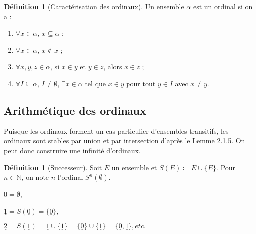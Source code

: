 \documentclass{article}
\theoremstyle{definition}
\newtheorem{definition}[subsubsection]{Définition}
\theoremstyle{plain}
\theoremstyle{plain}
\theoremstyle{plain}
\theoremstyle{plain}
\theoremstyle{plain}
\begin{document}
\begin{definition}[Caractérisation des ordinaux]
	Un ensemble \( \alpha \) est un ordinal si on a :
	\begin{enumerate}[label = (\roman*)]
		\item \( \forall x \in \alpha \), \( x \subseteq \alpha \) ;
		\item \( \forall x \in \alpha \), \( x \not\in x \) ;
		\item \( \forall x, y, z \in \alpha \), si \( x \in y \) et \( y \in z \), alors \( x \in z \) ;
		\item \( \forall I \subseteq \alpha \), \( I \neq \emptyset \), \( \exists x \in \alpha \) tel que \( x \in y \) pour tout \( y \in I \) avec \( x \neq y \).
	\end{enumerate}
\end{definition}

\subsection{Arithmétique des ordinaux}

\par Puisque les ordinaux forment un cas particulier d'ensembles transitifs, les ordinaux sont stables par union et par intersection d'après le Lemme 2.1.5. On peut donc construire une infinité d'ordinaux.

\begin{definition}[Successeur]
	Soit \( E \) un ensemble et \( S(E) \coloneqq E \cup \{E\} \). Pour \( n \in \mathbb{N} \), on note \( \underline{n} \) l'ordinal \( S^{n}(\emptyset) \).
\end{definition}

\begin{description}
	\item \( \underline{0} = \emptyset \),
	\item \( \underline{1} = S(\underline{0}) = \{\underline{0}\} \),
	\item \( \underline{2} = S(\underline{1}) = \underline{1} \cup  \{\underline{1}\} = \{\underline{0}\} \cup \{\underline{1}\} = \{\underline{0}, \underline{1}\},  etc.\)
\end{description}
\end{document}
